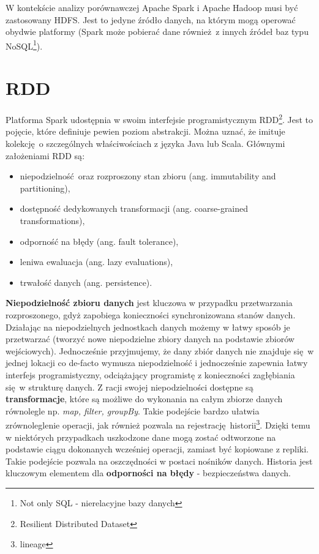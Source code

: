 \newline W kontekście analizy porównawczej Apache Spark i Apache Hadoop musi być zastosowany HDFS. Jest to jedyne źródło danych, na którym mogą operować obydwie platformy (Spark może pobierać dane również z innych źródeł baz typu NoSQL\footnote{Not only SQL - nierelacyjne bazy danych}).

\section{RDD}\label{rdd-section}
Platforma Spark udostępnia w swoim interfejsie programistycznym RDD\footnote{Resilient Distributed Dataset}. Jest to pojęcie, które definiuje pewien poziom abstrakcji. Można uznać, że imituje kolekcję o szczególnych właściwościach z języka Java lub Scala. Głównymi założeniami RDD są\cite{Zaharia:2012:RDD:2228298.2228301}:
\begin{itemize}
	\item niepodzielność oraz rozproszony stan zbioru (ang. immutability and partitioning),
	\item dostępność dedykowanych transformacji (ang. coarse-grained transformations),
	\item odporność na błędy (ang. fault tolerance),
	\item leniwa ewaluacja (ang. lazy evaluations),
	\item trwałość danych (ang. persistence).	
\end{itemize}
\textbf{Niepodzielność zbioru danych} jest kluczowa w przypadku przetwarzania rozproszonego, gdyż zapobiega konieczności synchronizowana stanów danych. Działając na niepodzielnych jednostkach danych możemy w łatwy sposób je przetwarzać (tworzyć nowe niepodzielne zbiory danych na podstawie zbiorów wejściowych). Jednocześnie przyjmujemy, że dany zbiór danych nie znajduje się w jednej lokacji co de-facto wymusza niepodzielność i jednocześnie zapewnia łatwy interfejs programistyczny, odciążający programistę z konieczności zagłębiania się w strukturę danych. 
\newline Z racji swojej niepodzielności dostępne są \textbf{transformacje}, które są możliwe do wykonania na całym zbiorze danych równolegle np. \textit{map, filter, groupBy}. Takie podejście bardzo ułatwia zrównoleglenie operacji, jak również pozwala na rejestrację historii\footnote{lineage}. Dzięki temu w niektórych przypadkach uszkodzone dane mogą zostać odtworzone na podstawie ciągu dokonanych wcześniej operacji, zamiast być kopiowane z repliki. Takie podejście pozwala na oszczędności w postaci nośników danych. Historia jest kluczowym elementem dla \textbf{odporności na błędy} - bezpieczeństwa danych.
